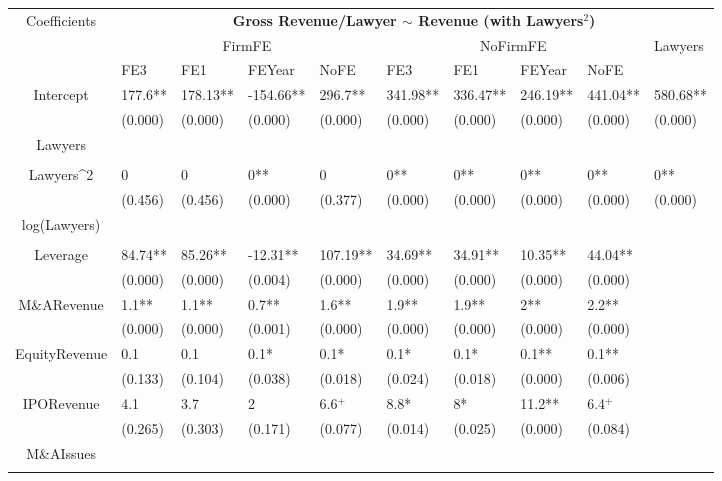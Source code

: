 \documentclass{article}
\begin{document}
\begin{table}[H]
\centering
\begin{tabular}{|clllllllll|}
\hline
\multirow{3}{*}{Coefficients} & \multicolumn{9}{c|}{\textbf{Gross Revenue/Lawyer $\sim$ Revenue (with Lawyers$^2$)}} \\
\cline{2-10}
& \multicolumn{4}{c}{FirmFE} & \multicolumn{4}{c}{NoFirmFE} & \multirow{2}{*}{Lawyers} \\
\cline{2-9}
& FE3 & FE1 & FEYear & NoFE & FE3 & FE1 & FEYear & NoFE &  \\
\hline
 
Intercept & 177.6** & 178.13** & -154.66** & 296.7** & 341.98** & 336.47** & 246.19** & 441.04** & 580.68** \\ 
   & (0.000) & (0.000) & (0.000) & (0.000) & (0.000) & (0.000) & (0.000) & (0.000) & (0.000) \\ 
  Lawyers &  &  &  &  &  &  &  &  &  \\ 
   &  &  &  &  &  &  &  &  &  \\ 
  Lawyers^2 & 0 & 0 & 0** & 0 & 0** & 0** & 0** & 0** & 0** \\ 
   & (0.456) & (0.456) & (0.000) & (0.377) & (0.000) & (0.000) & (0.000) & (0.000) & (0.000) \\ 
  log(Lawyers) &  &  &  &  &  &  &  &  &  \\ 
   &  &  &  &  &  &  &  &  &  \\ 
  Leverage & 84.74** & 85.26** & -12.31** & 107.19** & 34.69** & 34.91** & 10.35** & 44.04** &  \\ 
   & (0.000) & (0.000) & (0.004) & (0.000) & (0.000) & (0.000) & (0.000) & (0.000) &  \\ 
  M\&ARevenue & 1.1** & 1.1** & 0.7** & 1.6** & 1.9** & 1.9** & 2** & 2.2** &  \\ 
   & (0.000) & (0.000) & (0.001) & (0.000) & (0.000) & (0.000) & (0.000) & (0.000) &  \\ 
  EquityRevenue & 0.1 & 0.1 & 0.1* & 0.1* & 0.1* & 0.1* & 0.1** & 0.1** &  \\ 
   & (0.133) & (0.104) & (0.038) & (0.018) & (0.024) & (0.018) & (0.000) & (0.006) &  \\ 
  IPORevenue & 4.1 & 3.7 & 2 & 6.6$^{+}$ & 8.8* & 8* & 11.2** & 6.4$^{+}$ &  \\ 
   & (0.265) & (0.303) & (0.171) & (0.077) & (0.014) & (0.025) & (0.000) & (0.084) &  \\ 
  M\&AIssues &  &  &  &  &  &  &  &  &  \\ 
   &  &  &  &  &  &  &  &  &  \\ 

\end{tabular}
\end{table}
\end{document}

